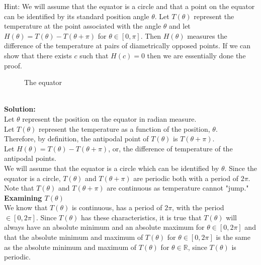 \documentclass[12pt]{book}
\begin{document}
\begin{enumerate}
\begin{minipage}{0.5\textwidth}
    Hint: We will assume that the equator is a circle and that a point on the equator can be identified by its standard position angle $\theta$. Let $T(\theta)$ represent the temperature at the point associated with the angle $\theta$ and let $H(\theta) = T(\theta) - T(\theta+\pi)$ for $\theta \in [0,\pi]$. Then $H(\theta)$ measures the difference of the temperature at pairs of diametrically opposed points. If we can show that there exists $c$ such that $H(c)=0$ then we are essentially done the proof.\\
\end{minipage}
\begin{minipage}{0.5\textwidth}
    \begin{figure}[H]
    \caption{The equator}
    \end{figure} 
\end{minipage}\\

\textbf{Solution:}\\
Let $\theta$ represent the position on the equator in radian measure.\\
Let $T(\theta)$ represent the temperature as a function of the position, $\theta$. \\
Therefore, by definition, the antipodal point of $T(\theta)$ is $T(\theta+\pi)$.\\
Let $H(\theta) = T(\theta) - T(\theta+\pi)$, or, the difference of temperature of the antipodal points.\\

We will assume that the equator is a circle which can be identified by $\theta$. Since the equator is a circle, $T(\theta)$ and $T(\theta+\pi)$ are periodic both with a period of $2\pi$. Note that $T(\theta)$ and $T(\theta+\pi)$ are continuous as temperature cannot "jump."\\

\textbf{Examining $T(\theta)$}\\
We know that $T(\theta)$ is continuous, has a period of $2\pi$, with the period $\in [0, 2\pi]$. Since $T(\theta)$ has these characteristics, it is true that $T(\theta)$ will always have an absolute minimum and an absolute maximum for $\theta \in [0, 2\pi]$ and that the absolute minimum and maximum of $T(\theta)$ for $\theta \in [0,2\pi]$ is the same as the absolute minimum and maximum of $T(\theta)$ for $\theta \in \mathbb{R}$, since $T(\theta)$ is periodic.\\


\end{enumerate}
\end{document}
